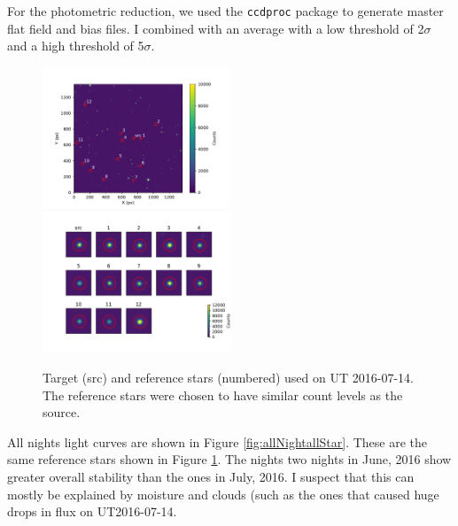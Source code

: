 \documentclass[twocolumn]{aastex61}
\begin{document}
For the photometric reduction, we used the \texttt{ccdproc} package to generate master flat field and bias files.
I combined with an average with a low threshold of 2$\sigma$ and a high threshold of 5$\sigma$.

\begin{figure}
\begin{centering}
\includegraphics[width=0.5\textwidth]{images/ut2016_07_14_clouds/figure_index_152.pdf}
\includegraphics[width=0.5\textwidth]{images/stamps_kic1255_UT2016_07_14.pdf}
\caption{Target (src) and reference stars (numbered) used on UT 2016-07-14.
The reference stars were chosen to have similar count levels as the source. 
}\label{fig:ut2016-07-14cloudImg}
\end{centering}
\end{figure}

All nights light curves are shown in Figure \ref{fig:allNightallStar}.
These are the same reference stars shown in Figure \ref{fig:ut2016-07-14cloudImg}.
The nights two nights in June, 2016 show greater overall stability than the ones in July, 2016.
I suspect that this can mostly be explained by moisture and clouds (such as the ones that caused huge drops in flux on UT2016-07-14.
\end{document}
